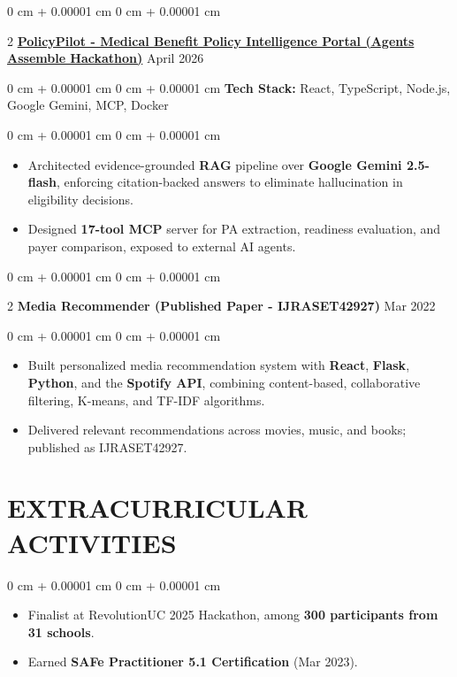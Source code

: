 \documentclass[9pt, letterpaper]{article}
\newenvironment{highlights}{
    \begin{itemize}[
        topsep=0.05 cm,
        parsep=0 pt,
        partopsep=0pt,
        itemsep=0pt,
        leftmargin=10pt
    ]
}{
    \end{itemize}
} %
\newenvironment{onecolentry}{
    \begin{adjustwidth}{
        0 cm + 0.00001 cm}{
        0 cm + 0.00001 cm}
}{
    \end{adjustwidth}
} %
\newenvironment{twocolentry}[2][]{
    \onecolentry
    \def\secondColumn{#2}
    \setcolumnwidth{\fill, 4.5 cm}
    \begin{paracol}{2}
}{
    \switchcolumn \raggedleft \secondColumn
    \end{paracol}
    \endonecolentry
} %
\begin{document}
    \begin{twocolentry}
        {April 2026}\href{https://github.com/Tanmayb05/Policy-Intelligence-Lab}{\textbf{PolicyPilot - Medical Benefit Policy Intelligence Portal (Agents Assemble Hackathon)}}    \end{twocolentry}
    \begin{onecolentry}\textbf{Tech Stack:} React, TypeScript, Node.js, Google Gemini, MCP, Docker \end{onecolentry}
    \begin{onecolentry}
        \begin{highlights}
            \item Architected evidence-grounded \textbf{RAG} pipeline over \textbf{Google Gemini 2.5-flash}, enforcing citation-backed answers to eliminate hallucination in eligibility decisions.
            \item Designed \textbf{17-tool MCP} server for PA extraction, readiness evaluation, and payer comparison, exposed to external AI agents.
        \end{highlights}
    \end{onecolentry}
    \vspace{0.04 cm}

    \begin{twocolentry}
        {Mar 2022}\textbf{Media Recommender (Published Paper - IJRASET42927)}    \end{twocolentry}
    \begin{onecolentry}
        \begin{highlights}
            \item Built personalized media recommendation system with \textbf{React}, \textbf{Flask}, \textbf{Python}, and the \textbf{Spotify API}, combining content-based, collaborative filtering, K-means, and TF-IDF algorithms.
            \item Delivered relevant recommendations across movies, music, and books; published as IJRASET42927.
        \end{highlights}
    \end{onecolentry}

\section{EXTRACURRICULAR ACTIVITIES}

    \begin{onecolentry}
        \begin{highlights}
            \item Finalist at RevolutionUC 2025 Hackathon, among \textbf{300 participants from 31 schools}.
            \item Earned \textbf{SAFe Practitioner 5.1 Certification} (Mar 2023).
        \end{highlights}
    \end{onecolentry}
\end{document}
